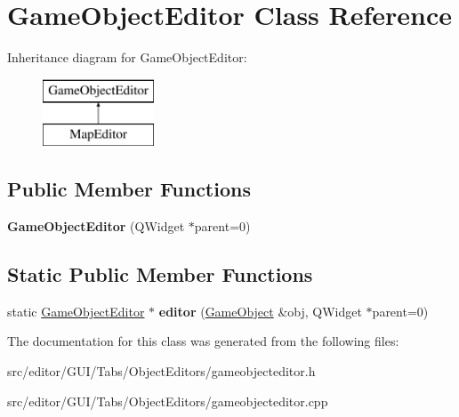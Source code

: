 \hypertarget{class_game_object_editor}{\section{\-Game\-Object\-Editor \-Class \-Reference}
\label{class_game_object_editor}
}
\-Inheritance diagram for \-Game\-Object\-Editor\-:\begin{figure}[H]
\begin{center}
\leavevmode
\includegraphics[height=2.000000cm]{class_game_object_editor}
\end{center}
\end{figure}
\subsection*{\-Public \-Member \-Functions}
\begin{DoxyCompactItemize}
\item 
\hypertarget{class_game_object_editor_a3ca8c1b7d22f2f3f8c6b518dae3e21a1}{{\bfseries \-Game\-Object\-Editor} (\-Q\-Widget $\ast$parent=0)}\label{class_game_object_editor_a3ca8c1b7d22f2f3f8c6b518dae3e21a1}

\end{DoxyCompactItemize}
\subsection*{\-Static \-Public \-Member \-Functions}
\begin{DoxyCompactItemize}
\item 
\hypertarget{class_game_object_editor_ad43ed39df888f6b06f9078ab8eff3380}{static \hyperlink{class_game_object_editor}{\-Game\-Object\-Editor} $\ast$ {\bfseries editor} (\hyperlink{class_game_object}{\-Game\-Object} \&obj, \-Q\-Widget $\ast$parent=0)}\label{class_game_object_editor_ad43ed39df888f6b06f9078ab8eff3380}

\end{DoxyCompactItemize}


\-The documentation for this class was generated from the following files\-:\begin{DoxyCompactItemize}
\item 
src/editor/\-G\-U\-I/\-Tabs/\-Object\-Editors/gameobjecteditor.\-h\item 
src/editor/\-G\-U\-I/\-Tabs/\-Object\-Editors/gameobjecteditor.\-cpp\end{DoxyCompactItemize}
